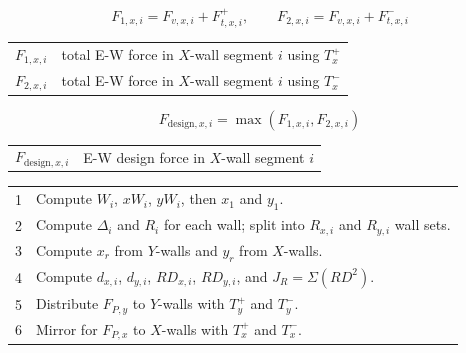 \documentclass[10pt]{article}
\begin{document}
\begin{equation}
F_{1,x,i}=F_{v,x,i}+F_{t,x,i}^{+}, \qquad
F_{2,x,i}=F_{v,x,i}+F_{t,x,i}^{-}
\end{equation}

{\ttfamily\footnotesize
\begin{tabular}{@{}ll@{}}
$F_{1,x,i}$ & total E-W force in $X$-wall segment $i$ using $T_x^+$ \\
$F_{2,x,i}$ & total E-W force in $X$-wall segment $i$ using $T_x^-$ \\
\end{tabular}
}

\begin{equation}
F_{\text{design},x,i}=\max(F_{1,x,i},F_{2,x,i})
\end{equation}

{\ttfamily\footnotesize
\begin{tabular}{@{}ll@{}}
$F_{\text{design},x,i}$ & E-W design force in $X$-wall segment $i$ \\
\end{tabular}
}


{\ttfamily\footnotesize
\begin{tabular}{@{}p{0.35in}p{6.35in}@{}}
1 & Compute $W_i$, $xW_i$, $yW_i$, then $x_1$ and $y_1$. \\
2 & Compute $\Delta_i$ and $R_i$ for each wall; split into $R_{x,i}$ and $R_{y,i}$ wall sets. \\
3 & Compute $x_r$ from $Y$-walls and $y_r$ from $X$-walls. \\
4 & Compute $d_{x,i}$, $d_{y,i}$, $RD_{x,i}$, $RD_{y,i}$, and $J_R=\Sigma(RD^2)$. \\
5 & Distribute $F_{P,y}$ to $Y$-walls with $T_y^+$ and $T_y^-$. \\
6 & Mirror for $F_{P,x}$ to $X$-walls with $T_x^+$ and $T_x^-$. \\
\end{tabular}
}
\end{document}
